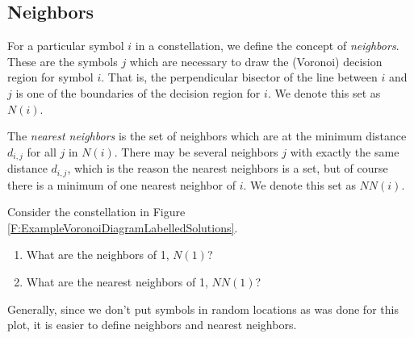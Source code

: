 \subsection{Neighbors}

For a particular symbol $i$ in a constellation, we define the concept of \emph{neighbors}.  These are the symbols $j$ which are necessary to draw the (Voronoi) decision region for symbol $i$.  That is, the perpendicular bisector of the line between $i$ and $j$ is one of the boundaries of the decision region for $i$.  We denote this set as $N(i)$.

The \emph{nearest neighbors} is the set of neighbors which are at the minimum distance $d_{i,j}$ for all $j$ in $N(i)$.  There may be several neighbors $j$ with exactly the same distance $d_{i,j}$, which is the reason the nearest neighbors is a set, but of course there is a minimum of one nearest neighbor of $i$.  We denote this set as $NN(i)$.


Consider the constellation in Figure \ref{F:ExampleVoronoiDiagramLabelledSolutions}.
\begin{enumerate}
\item What are the neighbors of 1, $N(1)$?
\item What are the nearest neighbors of 1, $NN(1)$?
\end{enumerate}


Generally, since we don't put symbols in random locations as was done for this plot, it is easier to define neighbors and nearest neighbors.

